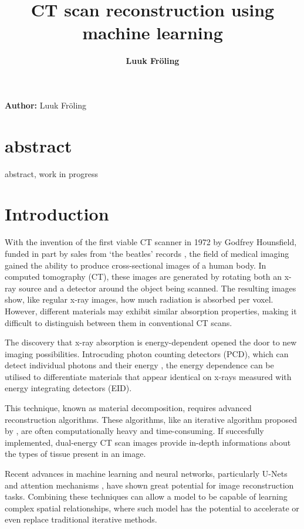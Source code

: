 \documentclass{article}
\title{CT scan reconstruction using machine learning}
\date{\displaydate{articleDate}}
\author{\bfseries Luuk Fröling\mdseries\\}
\begin{document}
\maketitle

\textbf{Author:} Luuk Fröling

\section{abstract}

abstract, work in progress

\section{Introduction}

With the invention of the first viable CT scanner in 1972 by Godfrey Hounsfield, funded in part by sales from `the beatles' records \citep{pietzsch2025ct}, the field of medical imaging gained the ability to produce cross-sectional images of a human body. In computed tomography (CT), these images are generated by rotating both an x-ray source and a detector around the object being scanned. The resulting images show, like regular x-ray images, how much radiation is absorbed per voxel. However, different materials may exhibit similar absorption properties, making it difficult to distinguish between them in conventional CT scans.

The discovery that x-ray absorption is energy-dependent opened the door to new imaging possibilities. Introcuding photon counting detectors (PCD), which can detect individual photons and their energy \citep{taguchi2013photon}, the energy dependence can be utilised to differentiate materials that appear identical on x-rays measured with energy integrating detectors (EID).

This technique, known as material decomposition, requires advanced reconstruction algorithms. These algorithms, like an iterative algorithm proposed by \citep{mechlem2018joint}, are often computationally heavy and time-consuming. If succesfully implemented, dual-energy CT scan images provide in-depth informations about the types of tissue present in an image.

Recent advances in machine learning and neural networks, particularly U-Nets \citep{vaswani2017attention} and attention mechanisms \citep{oktay2018attentionunet}, have shown great potential for image reconstruction tasks. Combining these techniques can allow a model to be capable of learning complex spatial relationships, where such model has the potential to accelerate or even replace traditional iterative methods.
\end{document}
